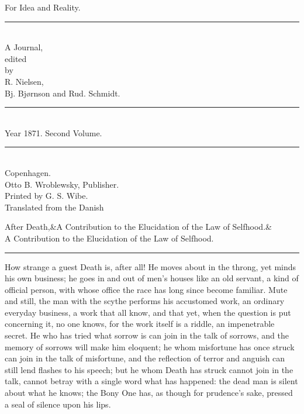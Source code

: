 \documentclass[12pt,a4paper,openany]{book}
\newcommand{\opage}[1]{\marginnote{\footnotesize\textit{[#1]}}}
\newcommand{\essayhead}[2]{\begin{center}{\large #1}\ifx&#2&\else\\[0.3em]{\normalsize #2}\fi\\[0.5em]\rule{3em}{0.4pt}\end{center}\medskip\noindent}
\begin{document}
\begin{titlepage}
\begin{center}
\vspace*{3em}
{\Huge For Idea and Reality.}\\[1em]
\rule{8em}{0.4pt}\\[1em]
{\large A Journal,}\\[0.8em]
{\small edited}\\[0.4em]
{\footnotesize by}\\[0.6em]
{\large R. Nielsen,}\\[0.4em]
{\large Bj. Bjørnson and Rud. Schmidt.}\\[1em]
\rule{8em}{0.4pt}\\[0.6em]
{\large Year 1871. Second Volume.}\\[0.6em]
\rule{8em}{0.4pt}\\[4em]
Copenhagen.\\[0.4em]
Otto B. Wroblewsky, Publisher.\\[1.5em]
{\small Printed by G. S. Wibe.}\\[3em]
{\small Translated from the Danish}
\end{center}
\end{titlepage}

\essayhead{After Death,}{A Contribution to the Elucidation of the Law of Selfhood.}
\setcounter{footnote}{0}%
\opage{193}How strange a guest Death is, after all! He moves about in the throng, yet minds his own business; he goes in and out
of men's houses like an old servant, a kind of official
person, with whose office the race has long since
become familiar. Mute and still, the man with the
scythe performs his accustomed work, an ordinary everyday business,
a work that all know, and that yet, when
the question is put concerning it, no one knows, for the work itself
is a riddle, an impenetrable secret. He
who has tried what sorrow is can join in the talk of sorrows,
and the memory of sorrows will make him eloquent; he
whom misfortune has once struck can join in the talk of misfortune,
and the reflection of terror and anguish can still lend flashes to his
speech; but he whom Death has struck cannot join
in the talk, cannot betray with a single word what has happened:
the dead man is silent about what he knows; the Bony One has,
as though for prudence's sake, pressed a seal of silence upon
his lips.
\end{document}

